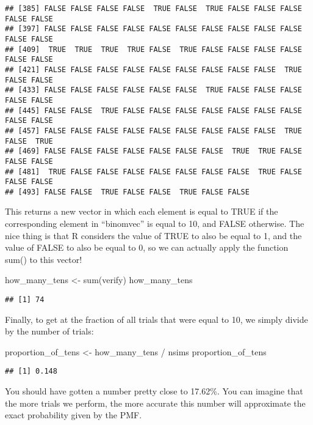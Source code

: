 \documentclass[
]{book}
\newenvironment{Shaded}{\begin{snugshade}}{\end{snugshade}}
\newcommand{\FunctionTok}[1]{\textcolor[rgb]{0.00,0.00,0.00}{#1}}
\newcommand{\NormalTok}[1]{#1}
\newcommand{\OtherTok}[1]{\textcolor[rgb]{0.56,0.35,0.01}{#1}}
\newcommand{\SpecialCharTok}[1]{\textcolor[rgb]{0.00,0.00,0.00}{#1}}
\begin{document}
\begin{verbatim}
## [385] FALSE FALSE FALSE FALSE  TRUE FALSE  TRUE FALSE FALSE FALSE FALSE FALSE
## [397] FALSE FALSE FALSE FALSE FALSE FALSE FALSE FALSE FALSE FALSE FALSE FALSE
## [409]  TRUE  TRUE  TRUE  TRUE FALSE  TRUE FALSE FALSE FALSE FALSE FALSE FALSE
## [421] FALSE FALSE FALSE FALSE FALSE FALSE FALSE FALSE FALSE  TRUE FALSE FALSE
## [433] FALSE FALSE FALSE FALSE FALSE FALSE  TRUE FALSE FALSE FALSE FALSE FALSE
## [445] FALSE FALSE  TRUE FALSE FALSE FALSE FALSE FALSE FALSE FALSE FALSE FALSE
## [457] FALSE FALSE FALSE FALSE FALSE FALSE FALSE FALSE FALSE  TRUE FALSE  TRUE
## [469] FALSE FALSE FALSE FALSE FALSE FALSE FALSE  TRUE  TRUE FALSE FALSE FALSE
## [481]  TRUE FALSE FALSE FALSE FALSE FALSE FALSE FALSE  TRUE FALSE FALSE FALSE
## [493] FALSE FALSE  TRUE FALSE FALSE  TRUE FALSE FALSE
\end{verbatim}

This returns a new vector in which each element is equal to TRUE if the corresponding element in ``binomvec'' is equal to 10, and FALSE otherwise. The nice thing is that R considers the value of TRUE to also be equal to 1, and the value of FALSE to also be equal to 0, so we can actually apply the function sum() to this vector!

\begin{Shaded}
\begin{Highlighting}[]
\NormalTok{how\_many\_tens }\OtherTok{\textless{}{-}} \FunctionTok{sum}\NormalTok{(verify)}
\NormalTok{how\_many\_tens}
\end{Highlighting}
\end{Shaded}

\begin{verbatim}
## [1] 74
\end{verbatim}

Finally, to get at the fraction of all trials that were equal to 10, we simply divide by the number of trials:

\begin{Shaded}
\begin{Highlighting}[]
\NormalTok{proportion\_of\_tens }\OtherTok{\textless{}{-}}\NormalTok{ how\_many\_tens }\SpecialCharTok{/}\NormalTok{ nsims}
\NormalTok{proportion\_of\_tens}
\end{Highlighting}
\end{Shaded}

\begin{verbatim}
## [1] 0.148
\end{verbatim}

You should have gotten a number pretty close to 17.62\%. You can imagine that the more trials we perform, the more accurate this number will approximate the exact probability given by the PMF.
\end{document}
